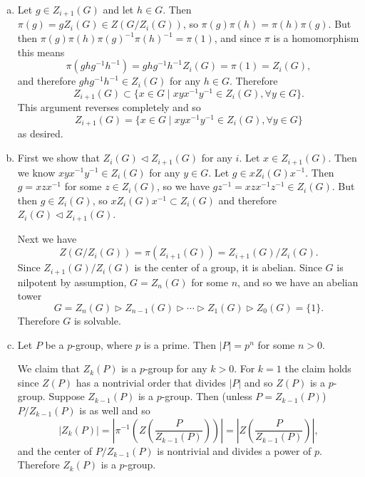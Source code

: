 \documentclass{article}
\begin{document}
\begin{Answer}
\begin{enumerate}[(a)]
  \item{
    Let $g \in Z_{i+1}(G)$ and let $h \in G$. Then
    $\pi(g) = g Z_{i}(G) \in Z(G / Z_i(G))$,
    so $\pi(g) \pi(h) = \pi(h) \pi(g)$. But then
    $\pi(g)\pi(h)\pi(g)^{-1}\pi(h)^{-1} = \pi(1)$, and since $\pi$ is
    a homomorphism this means
    $$
      \pi(ghg^{-1}h^{-1})
    = ghg^{-1}h^{-1} Z_i(G)
    = \pi(1)
    = Z_i(G),
    $$
    and therefore $ghg^{-1}h^{-1} \in Z_i(G)$ for any $h \in
    G$. Therefore
    $$
    Z_{i+1}(G) \subset \{ x \in G
                         \mid
                         xyx^{-1}y^{-1} \in Z_i(G), \forall y \in G
                      \}.
    $$
    This argument reverses completely and so
    $$
    Z_{i+1}(G) =\{ x \in G
                  \mid
                  xyx^{-1}y^{-1} \in Z_i(G), \forall y \in G
               \}
    $$
    as desired.
  }
  \item{
    First we show that $Z_{i}(G) \triangleleft Z_{i+1}(G)$ for any
    $i$. Let $x \in Z_{i+1}(G)$. Then we know $xyx^{-1}y^{-1} \in
    Z_i(G)$ for any $y \in G$. Let $g \in x Z_{i}(G) x^{-1}$. Then
    $g = xzx^{-1}$ for some $z \in Z_{i}(G)$, so we have
    $gz^{-1} = xzx^{-1}z^{-1} \in Z_{i}(G)$. But then $g \in
    Z_{i}(G)$, so $x Z_{i}(G) x^{-1} \subset Z_{i}(G)$ and therefore
    $Z_{i}(G) \triangleleft Z_{i+1}(G)$.

    Next we have
    $$
      Z(G / Z_{i}(G))
    = \pi(Z_{i+1}(G))
    = Z_{i+1}(G) / Z_{i}(G).
    $$
    Since $Z_{i+1}(G) / Z_{i}(G)$ is the center of a group, it is
    abelian. Since $G$ is nilpotent by assumption, $G = Z_n(G)$ for
    some $n$, and so we have an abelian tower
    $$
    G = Z_n(G)
    \triangleright Z_{n-1}(G)
    \triangleright \cdots
    \triangleright Z_1(G)
    \triangleright Z_0(G) = \{ 1 \}.
    $$
    Therefore $G$ is solvable.
  }
  \item{
    Let $P$ be a $p$-group, where $p$ is a prime.
    Then $|P| = p^n$ for some $n > 0$.

    We claim that $Z_k(P)$ is a $p$-group for any $k > 0$.
    For $k = 1$ the claim holds since $Z(P)$ has a nontrivial order
    that divides $|P|$ and so $Z(P)$ is a $p$-group.
    Suppose $Z_{k-1}(P)$ is a $p$-group. Then (unless $P =
    Z_{k-1}(P)$) $P / Z_{k-1}(P)$ is as
    well and so
    $$
      |Z_k(P)|
    = \left|\pi^{-1}\left(Z\left(\frac{P}{Z_{k-1}(P)}\right)\right)\right|
    = \left|Z\left(\frac{P}{Z_{k-1}(P)}\right)\right|,
    $$
    and the center of $P / Z_{k-1}(P)$ is nontrivial and divides a
    power of $p$. Therefore $Z_k(P)$ is a $p$-group.

}
\end{enumerate}
\end{Answer}
\end{document}
